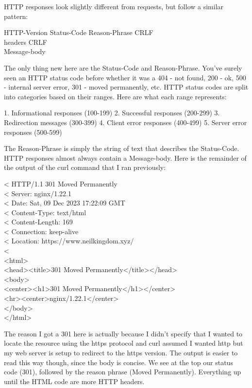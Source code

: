 \documentclass{article}
\begin{document}
HTTP responses look slightly different from requests, but follow a similar pattern:

HTTP-Version Status-Code Reason-Phrase CRLF\\
headers CRLF\\
Message-body

The only thing new here are the Status-Code and Reason-Phrase. You've surely seen an HTTP status code before 
whether it was a 404 - not found, 200 - ok, 500 - internal server error, 301 - moved permanently, etc. 
HTTP status codes are split into categories based on their ranges. Here are what each range represents:

1. Informational responses (100-199)
2. Successful responses (200-299)
3. Redirection messages (300-399)
4. Client error responses (400-499)
5. Server error responses (500-599)

The Reason-Phrase is simply the string of text that describes the Status-Code. HTTP responses almost always 
contain a Message-body. Here is the remainder of the output of the curl command that I ran previously:

< HTTP/1.1 301 Moved Permanently\\
< Server: nginx/1.22.1\\
< Date: Sat, 09 Dec 2023 17:22:09 GMT\\
< Content-Type: text/html\\
< Content-Length: 169\\
< Connection: keep-alive\\
< Location: https://www.neilkingdom.xyz/\\
<\\
<html>\\
<head><title>301 Moved Permanently</title></head>\\
<body>\\
<center><h1>301 Moved Permanently</h1></center>\\
<hr><center>nginx/1.22.1</center>\\
</body>\\
</html>

The reason I got a 301 here is actually because I didn't specify that I wanted to locate the resource using 
the https protocol and curl assumed I wanted http but my web server is setup to redirect to the https version.
The output is easier to read this way though, since the body is concise. We see at the top our status code 
(301), followed by the reason phrase (Moved Permanently). Everything up until the HTML code are more HTTP 
headers. 
\end{document}
